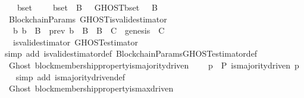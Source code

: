 \begin{isabellebody}
\ \ {\isachardoublequoteopen}{\isasymforall}\ {\isasymsigma}\ b{\isacharunderscore}set{\isachardot}\ {\isasymsigma}\ {\isasymin}\ {\isasymSigma}\ {\isasymand}\ b{\isacharunderscore}set\ {\isasymsubseteq}\ B\ {\isasymlongrightarrow}\ \ GHOST{\isacharparenleft}b{\isacharunderscore}set{\isacharcomma}\ {\isasymsigma}{\isacharparenright}\ {\isasymsubseteq}\ B{\isachardoublequoteclose}\isanewline
%
\isadelimproof
\ \ %
\endisadelimproof
%
\isatagproof
{}\isamarkupfalse%
%
\endisatagproof
{\isafoldproof}%
%
\isadelimproof
\isanewline
%
\endisadelimproof
\isanewline
{}\isamarkupfalse%
\ {\isacharparenleft}\ BlockchainParams{\isacharparenright}\ GHOST{\isacharunderscore}is{\isacharunderscore}valid{\isacharunderscore}estimator\ {\isacharcolon}\ \isanewline
\ \ {\isachardoublequoteopen}{\isacharparenleft}{\isasymforall}\ b{\isachardot}\ b\ {\isasymin}\ B\ {\isasymlongleftrightarrow}\ prev\ b\ {\isasymin}\ B{\isacharparenright}\ {\isasymand}\ B\ {\isacharequal}\ C\ {\isasymand}\ genesis\ {\isasymin}\ C\ \isanewline
\ \ {\isasymLongrightarrow}\ is{\isacharunderscore}valid{\isacharunderscore}estimator\ GHOST{\isacharunderscore}estimator{\isachardoublequoteclose}\isanewline
%
\isadelimproof
\ \ %
\endisadelimproof
%
\isatagproof
{}\isamarkupfalse%
\ {\isacharparenleft}simp\ add{\isacharcolon}\ is{\isacharunderscore}valid{\isacharunderscore}estimator{\isacharunderscore}def\ BlockchainParams{\isachardot}GHOST{\isacharunderscore}estimator{\isacharunderscore}def{\isacharparenright}\isanewline
\ \ \isamarkupfalse%
%
\endisatagproof
{\isafoldproof}%
%
\isadelimproof
\isanewline
%
\endisadelimproof
\isanewline
{}\isamarkupfalse%
\ {\isacharparenleft}\ Ghost{\isacharparenright}\ block{\isacharunderscore}membership{\isacharunderscore}property{\isacharunderscore}is{\isacharunderscore}majority{\isacharunderscore}driven\ {\isacharcolon}\isanewline
\ \ {\isachardoublequoteopen}{\isasymforall}\ p\ {\isasymin}\ P{\isachardot}\ is{\isacharunderscore}majority{\isacharunderscore}driven\ p{\isachardoublequoteclose}\isanewline
%
\isadelimproof
\ \ %
\endisadelimproof
%
\isatagproof
{}\isamarkupfalse%
\ {\isacharparenleft}simp\ add{\isacharcolon}\ is{\isacharunderscore}majority{\isacharunderscore}driven{\isacharunderscore}def{\isacharparenright}\isanewline
\ \ \isanewline
\ \ \isamarkupfalse%
%
\endisatagproof
{\isafoldproof}%
%
\isadelimproof
\isanewline
%
\endisadelimproof
\isanewline
{}\isamarkupfalse%
\ {\isacharparenleft}\ Ghost{\isacharparenright}\ block{\isacharunderscore}membership{\isacharunderscore}property{\isacharunderscore}is{\isacharunderscore}max{\isacharunderscore}driven\ {\isacharcolon}\isanewline

\end{isabellebody}
